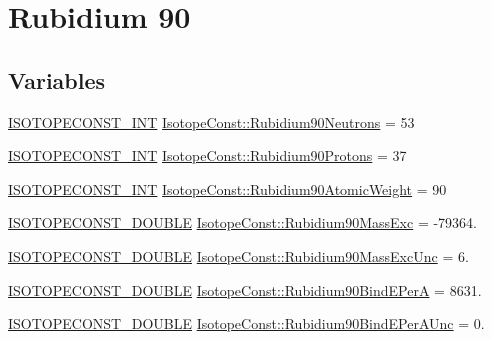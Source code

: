 \hypertarget{group___isotope_const-_rubidium-_rb90}{}\section{Rubidium 90}
\label{group___isotope_const-_rubidium-_rb90}
\subsection*{Variables}
\begin{DoxyCompactItemize}
\item 
\mbox{\hyperlink{group___isotope_const-_macros_ga5f18360b3e99483a35c32d789e62621c}{I\+S\+O\+T\+O\+P\+E\+C\+O\+N\+S\+T\+\_\+\+I\+NT}} \mbox{\hyperlink{group___isotope_const-_rubidium-_rb90_ga16f1a8f315759ba7afa5da29315dc3f1}{Isotope\+Const\+::\+Rubidium90\+Neutrons}} = 53
\item 
\mbox{\hyperlink{group___isotope_const-_macros_ga5f18360b3e99483a35c32d789e62621c}{I\+S\+O\+T\+O\+P\+E\+C\+O\+N\+S\+T\+\_\+\+I\+NT}} \mbox{\hyperlink{group___isotope_const-_rubidium-_rb90_gaa107e2b27f275555b371840367150384}{Isotope\+Const\+::\+Rubidium90\+Protons}} = 37
\item 
\mbox{\hyperlink{group___isotope_const-_macros_ga5f18360b3e99483a35c32d789e62621c}{I\+S\+O\+T\+O\+P\+E\+C\+O\+N\+S\+T\+\_\+\+I\+NT}} \mbox{\hyperlink{group___isotope_const-_rubidium-_rb90_gaa652547e419402d80f3678efcb45b18d}{Isotope\+Const\+::\+Rubidium90\+Atomic\+Weight}} = 90
\item 
\mbox{\hyperlink{group___isotope_const-_macros_ga8f45a7272ce02c0b4c65c44636ed719a}{I\+S\+O\+T\+O\+P\+E\+C\+O\+N\+S\+T\+\_\+\+D\+O\+U\+B\+LE}} \mbox{\hyperlink{group___isotope_const-_rubidium-_rb90_gaec19844685c3464457ba73291af59876}{Isotope\+Const\+::\+Rubidium90\+Mass\+Exc}} = -\/79364.
\item 
\mbox{\hyperlink{group___isotope_const-_macros_ga8f45a7272ce02c0b4c65c44636ed719a}{I\+S\+O\+T\+O\+P\+E\+C\+O\+N\+S\+T\+\_\+\+D\+O\+U\+B\+LE}} \mbox{\hyperlink{group___isotope_const-_rubidium-_rb90_ga769179c50fbf1a01ff65d357ad84d692}{Isotope\+Const\+::\+Rubidium90\+Mass\+Exc\+Unc}} = 6.
\item 
\mbox{\hyperlink{group___isotope_const-_macros_ga8f45a7272ce02c0b4c65c44636ed719a}{I\+S\+O\+T\+O\+P\+E\+C\+O\+N\+S\+T\+\_\+\+D\+O\+U\+B\+LE}} \mbox{\hyperlink{group___isotope_const-_rubidium-_rb90_gaf7c69fd593031d2c2beec0cfc803ad12}{Isotope\+Const\+::\+Rubidium90\+Bind\+E\+PerA}} = 8631.
\item 
\mbox{\hyperlink{group___isotope_const-_macros_ga8f45a7272ce02c0b4c65c44636ed719a}{I\+S\+O\+T\+O\+P\+E\+C\+O\+N\+S\+T\+\_\+\+D\+O\+U\+B\+LE}} \mbox{\hyperlink{group___isotope_const-_rubidium-_rb90_ga82ed6f5499b71646281cf14865704dca}{Isotope\+Const\+::\+Rubidium90\+Bind\+E\+Per\+A\+Unc}} = 0.

\end{DoxyCompactItemize}
